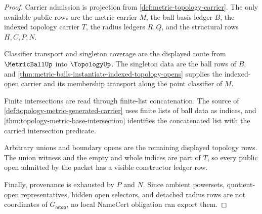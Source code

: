\begin{proof}
Carrier admission is projection from \autoref{def:metric-topology-carrier}. The only available public rows are the metric carrier $M$, the ball basis ledger $B$, the indexed topology carrier $T$, the radius ledgers $R,Q$, and the structural rows $H,C,P,N$.

Classifier transport and singleton coverage are the displayed route from $\MetricBallUp$ into $\TopologyUp$. The singleton data are the ball rows of $B$, and \autoref{thm:metric-balls-instantiate-indexed-topology-opens} supplies the indexed-open carrier and its membership transport along the point classifier of $M$.

Finite intersections are read through finite-list concatenation. The source of \autoref{def:topology-metric-generated-carrier} uses finite lists of ball data as indices, and \autoref{thm:topology-metric-base-intersection} identifies the concatenated list with the carried intersection predicate.

Arbitrary unions and boundary opens are the remaining displayed topology rows. The union witness and the empty and whole indices are part of $T$, so every public open admitted by the packet has a visible constructor ledger row.

Finally, provenance is exhausted by $P$ and $N$. Since ambient powersets, quotient-open representatives, hidden open selectors, and detached radius rows are not coordinates of $G_{\mathsf{mtop}}$, no local NameCert obligation can export them.
\end{proof}

